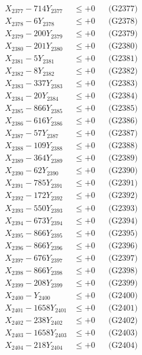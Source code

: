 \documentclass[a4paper,10pt]{article}
\begin{document}
{\begin{align}
X_{2377} - 714Y_{2377} &\leq +0 && \text{(G2377)} \\
X_{2378} - 6Y_{2378} &\leq +0 && \text{(G2378)} \\
X_{2379} - 200Y_{2379} &\leq +0 && \text{(G2379)} \\
X_{2380} - 201Y_{2380} &\leq +0 && \text{(G2380)} \\
\allowbreak
X_{2381} - 5Y_{2381} &\leq +0 && \text{(G2381)} \\
X_{2382} - 8Y_{2382} &\leq +0 && \text{(G2382)} \\
X_{2383} - 337Y_{2383} &\leq +0 && \text{(G2383)} \\
X_{2384} - 20Y_{2384} &\leq +0 && \text{(G2384)} \\
X_{2385} - 866Y_{2385} &\leq +0 && \text{(G2385)} \\
X_{2386} - 616Y_{2386} &\leq +0 && \text{(G2386)} \\
X_{2387} - 57Y_{2387} &\leq +0 && \text{(G2387)} \\
X_{2388} - 109Y_{2388} &\leq +0 && \text{(G2388)} \\
X_{2389} - 364Y_{2389} &\leq +0 && \text{(G2389)} \\
X_{2390} - 62Y_{2390} &\leq +0 && \text{(G2390)} \\
\allowbreak
X_{2391} - 785Y_{2391} &\leq +0 && \text{(G2391)} \\
X_{2392} - 172Y_{2392} &\leq +0 && \text{(G2392)} \\
X_{2393} - 550Y_{2393} &\leq +0 && \text{(G2393)} \\
X_{2394} - 673Y_{2394} &\leq +0 && \text{(G2394)} \\
X_{2395} - 866Y_{2395} &\leq +0 && \text{(G2395)} \\
X_{2396} - 866Y_{2396} &\leq +0 && \text{(G2396)} \\
X_{2397} - 676Y_{2397} &\leq +0 && \text{(G2397)} \\
X_{2398} - 866Y_{2398} &\leq +0 && \text{(G2398)} \\
X_{2399} - 208Y_{2399} &\leq +0 && \text{(G2399)} \\
X_{2400} - Y_{2400} &\leq +0 && \text{(G2400)} \\
\allowbreak
X_{2401} - 1658Y_{2401} &\leq +0 && \text{(G2401)} \\
X_{2402} - 238Y_{2402} &\leq +0 && \text{(G2402)} \\
X_{2403} - 1658Y_{2403} &\leq +0 && \text{(G2403)} \\
X_{2404} - 218Y_{2404} &\leq +0 && \text{(G2404)} \\

\end{align}}
\end{document}
